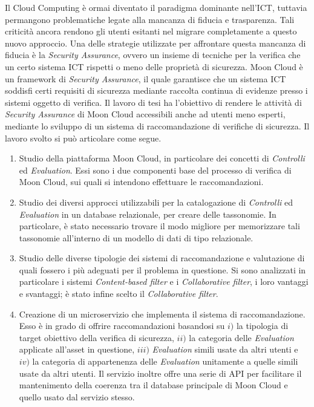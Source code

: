 \documentclass[10pt,a4paper]{article}
\begin{document}
\hfill\break
Il Cloud Computing è ormai diventato il paradigma dominante nell'ICT, tuttavia permangono problematiche legate alla mancanza di fiducia e trasparenza.
Tali criticità ancora rendono gli utenti esitanti nel migrare completamente a questo nuovo approccio.
Una delle strategie utilizzate per affrontare questa mancanza di fiducia è la \textit{Security Assurance}, ovvero un insieme di tecniche
per la verifica che un certo sistema ICT rispetti o meno delle proprietà di sicurezza.\hfill\break 
%
Moon Cloud è un framework di \textit{Security Assurance}, il quale garantisce che un sistema ICT soddisfi certi requisiti di sicurezza mediante raccolta continua di evidenze
presso i sistemi oggetto di verifica.
%
Il lavoro di tesi ha l'obiettivo di rendere le attività di \textit{Security Assurance} di Moon Cloud accessibili anche ad utenti meno esperti,
mediante lo sviluppo di un sistema di raccomandazione di verifiche di sicurezza. Il lavoro svolto si può articolare come segue.
\begin{enumerate}
    \item Studio della piattaforma Moon Cloud, in particolare dei concetti di \textit{Controlli} ed \textit{Evaluation}.
    Essi sono i due componenti base del processo di verifica di Moon Cloud, sui quali si intendono effettuare le raccomandazioni.
    \item Studio dei diversi approcci utilizzabili per la catalogazione di \textit{Controlli} ed \textit{Evaluation} in un database
    relazionale, per creare delle tassonomie. In particolare, è stato necessario trovare il modo migliore per memorizzare tali tassonomie all'interno
    di un modello di dati di tipo relazionale.
    \item Studio delle diverse tipologie dei sistemi di raccomandazione e valutazione di quali fossero i più adeguati per il problema in questione.
    Si sono analizzati in particolare i sistemi \textit{Content-based filter} e i \textit{Collaborative filter}, i loro vantaggi e svantaggi; è
    stato infine scelto il \textit{Collaborative filter}.

    \item Creazione di un microservizio che implementa il sistema di raccomandazione. Esso è in grado di offrire raccomandazioni basandosi
    su $i)$ la tipologia di target obiettivo della verifica di sicurezza, $ii)$ la categoria delle \textit{Evaluation} applicate all’asset in questione, $iii)$ 
    \textit{Evaluation} simili usate da altri utenti e $iv)$ la categoria di appartenenza delle \textit{Evaluation} unitamente a quelle simili usate da altri utenti.
    Il servizio inoltre offre una serie di API per facilitare il mantenimento della coerenza tra il database principale di Moon Cloud e quello
    usato dal servizio stesso.
\end{enumerate}
\end{document}
